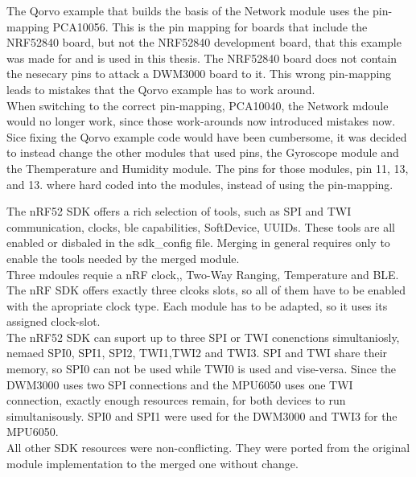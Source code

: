 The Qorvo example that builds the basis of the Network module uses the pin-mapping PCA10056.
This is the pin mapping for boards that include the NRF52840 board, but not the NRF52840 development board, that this example was made for and is used in this thesis.
The NRF52840 board does not contain the nesecary pins to attack a DWM3000 board to it.
This wrong pin-mapping leads to mistakes that the Qorvo example has to work around.\\
When switching to the correct pin-mapping, PCA10040, the Network mdoule would no longer work, since those work-arounds now introduced mistakes now.
Sice fixing the Qorvo example code would have been cumbersome, it was decided to instead change the other modules that used pins, the Gyroscope module and the Themperature and Humidity module.
The pins for those modules, pin 11, 13, and 13. where hard coded into the modules, instead of using the pin-mapping.


The nRF52 SDK offers a rich selection of tools, such as SPI and TWI communication, clocks, ble capabilities, SoftDevice, UUIDs.
These tools are all enabled or disbaled in the sdk{\_}config file.
Merging in general requires only to enable the tools needed by the merged module.\\
Three mdoules requie a nRF clock,, Two-Way Ranging, Temperature and BLE.
The nRF SDK offers  exactly three clcoks slots, so all of them have to be enabled with the apropriate clock type.
Each module has to be adapted, so it uses its assigned clock-slot. \\
The nRF52 SDK can suport up to three SPI or TWI conenctions simultaniosly, nemaed SPI0, SPI1, SPI2, TWI1,TWI2 and TWI3.
SPI and TWI share their memory, so SPI0 can not be used while TWI0 is used and vise-versa.
Since the DWM3000 uses two SPI connections and the MPU6050 uses one TWI connection, exactly enough resources remain, for both devices to run simultanisously.
SPI0 and SPI1 were used for the DWM3000 and TWI3 for the MPU6050.\\
All other SDK resources were non-conflicting.
They were ported from the original module implementation to the merged one without change.


